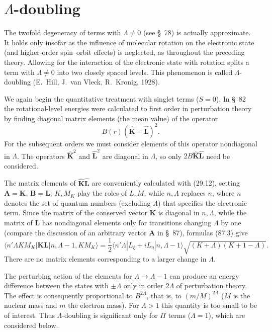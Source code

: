 \section{$\Lambda$-doubling}

The twofold degeneracy of terms with $\Lambda\ne0$ (see \S~78) is actually approximate. It holds only insofar as the influence of molecular rotation on the electronic state (and higher-order spin--orbit effects) is neglected, as throughout the preceding theory. Allowing for the interaction of the electronic state with rotation splits a term with $\Lambda\ne0$ into two closely spaced levels. This phenomenon is called $\Lambda$-doubling (E.~Hill, J.~van Vleck, R.~Kronig, 1928).

We again begin the quantitative treatment with singlet terms ($S=0$). In \S~82 the rotational-level energies were calculated to first order in perturbation theory by finding diagonal matrix elements (the mean value) of the operator
\[
B(r)(\widehat{\mathbf K}-\widehat{\mathbf L})^2.
\]
For the subsequent orders we must consider elements of this operator nondiagonal in $\Lambda$. The operators $\widehat{\mathbf K}^2$ and $\widehat{\mathbf L}^2$ are diagonal in $\Lambda$, so only $2B\widehat{\mathbf K}\widehat{\mathbf L}$ need be considered.

The matrix elements of $\widehat{\mathbf K}\widehat{\mathbf L}$ are conveniently calculated with (29.12), setting $\mathbf A=\mathbf K$, $\mathbf B=\mathbf L$; $K,M_K$ play the roles of $L,M$, while $n,\Lambda$ replaces $n$, where $n$ denotes the set of quantum numbers (excluding $\Lambda$) that specifies the electronic term. Since the matrix of the conserved vector $\mathbf K$ is diagonal in $n,\Lambda$, while the matrix of $\mathbf L$ has nondiagonal elements only for transitions changing $\Lambda$ by one (compare the discussion of an arbitrary vector $\mathbf A$ in \S~87), formulas (87.3) give
\begin{equation}
\langle n'\Lambda KM_K|\mathbf{KL}|n,\Lambda-1,KM_K\rangle
=\frac12\langle n'\Lambda|L_\xi+iL_\eta|n,\Lambda-1\rangle
\sqrt{(K+\Lambda)(K+1-\Lambda)}.
\tag{88.1}
\end{equation}
There are no matrix elements corresponding to a larger change in $\Lambda$.

The perturbing action of the elements for $\Lambda\to\Lambda-1$ can produce an energy difference between the states with $\pm\Lambda$ only in order $2\Lambda$ of perturbation theory. The effect is consequently proportional to $B^{2\Lambda}$, that is, to $(m/M)^{2\Lambda}$ ($M$ is the nuclear mass and $m$ the electron mass). For $\Lambda>1$ this quantity is too small to be of interest. Thus $\Lambda$-doubling is significant only for $\Pi$ terms ($\Lambda=1$), which are considered below.

